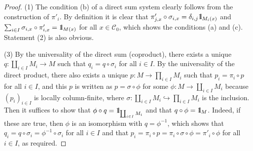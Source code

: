 \documentclass{surv-l}
\numberwithin{equation}{chapter}
\numberwithin{figure}{chapter}
\theoremstyle{plain}
\theoremstyle{definition}
\theoremstyle{remark}
\newcommand{\id}{1\kern-.25em{\text{{\rm l}}}}
\begin{document}
\begin{proof}
(1) The condition (b) of a direct sum system clearly follows
from the construction of $\pi'_i$.
By definition it is clear that
$\pi'_{j,x}\circ \sigma_{i,x} = \delta_{i,j} \id_{M_i(x)}$ and
$\sum_{i\in I} \sigma_{i,x} \circ \pi'_{i,x} = \id_{M(x)}$
for all $x \in {\mathcal{C}}_0$, which shows
the conditions (a) and (c).
Statement (2) is also obvious.

(3) By the universality of the direct sum (coproduct),
there exists a unique $q \colon \coprod_{i\in I}M_i \to M$ such that
$q_i = q \circ \sigma_i$ for all $i \in I$.
By the universality of the direct product,
there also exists a unique $p \colon M \to \prod_{i\in I}M_i$ such that
$p_i = \pi_i \circ p$ for all $i \in I$, and this $p$ is written as
$p = \sigma \circ \phi$ for some $\phi \colon M \to \coprod_{i\in I}M_i$
because $(p_i)_{i\in I}$ is locally column-finite, where
$\sigma \colon \coprod_{i\in I}M_i \hookrightarrow \prod_{i\in I}M_i$
is the inclusion.
Then it suffices to show that
$\phi\circ q= \id_{\coprod_{i\in I}M_i}$ and that $q \circ \phi = \id_M$.
Indeed, if these are true, then $\phi$ is an isomorphism with
$q=\phi^{-1}$, which shows that
$q_i = q \circ \sigma_i = \phi^{-1} \circ \sigma_i$ for all $i \in I$ and that
$p_i = \pi_i \circ p = \pi_i \circ \sigma \circ \phi = \pi'_i\circ \phi$ for all $i \in I$,
as required.


\end{proof}
\end{document}
